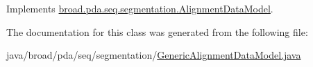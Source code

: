 Implements \hyperlink{interfacebroad_1_1pda_1_1seq_1_1segmentation_1_1_alignment_data_model_a814fa99f882ac0c3684d74b374943c42}{broad.\+pda.\+seq.\+segmentation.\+Alignment\+Data\+Model}.



The documentation for this class was generated from the following file\+:\begin{DoxyCompactItemize}
\item 
java/broad/pda/seq/segmentation/\hyperlink{_generic_alignment_data_model_8java}{Generic\+Alignment\+Data\+Model.\+java}\end{DoxyCompactItemize}
